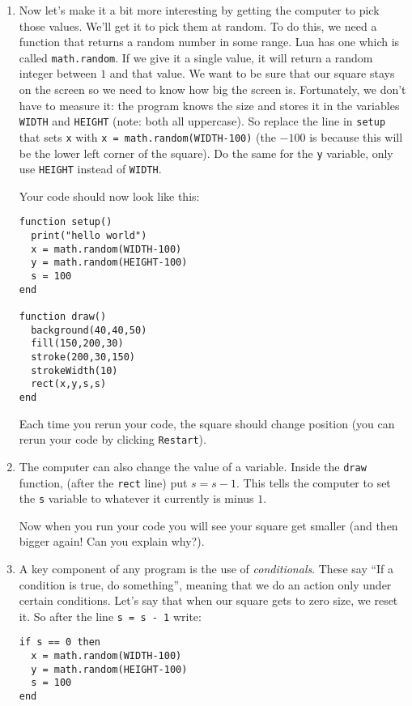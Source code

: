 \documentclass[
  xhtml,%
  text
]{internet}
\begin{document}
\begin{enumerate}
\item Now let's make it a bit more interesting by getting the computer to pick those values.
We'll get it to pick them at random.
To do this, we need a function that returns a random number in some range.
Lua has one which is called \verb+math.random+.
If we give it a single value, it will return a random integer between \(1\) and that value.
We want to be sure that our square stays on the screen so we need to know how big the screen is.
Fortunately, we don't have to measure it: the program knows the size and stores it in the variables \verb+WIDTH+ and \verb+HEIGHT+ (note: both all uppercase).
So replace the line in \verb+setup+ that sets \verb+x+ with \verb+x = math.random(WIDTH-100)+ (the \(-100\) is because this will be the lower left corner of the square).
Do the same for the \verb+y+ variable, only use \verb+HEIGHT+ instead of \verb+WIDTH+.

Your code should now look like this:

\begin{verbatim}
function setup()
  print("hello world")
  x = math.random(WIDTH-100)
  y = math.random(HEIGHT-100)
  s = 100
end

function draw()
  background(40,40,50)
  fill(150,200,30)
  stroke(200,30,150)
  strokeWidth(10)
  rect(x,y,s,s)
end
\end{verbatim}

Each time you rerun your code, the square should change position (you can rerun your code by clicking \verb+Restart+).

\item The computer can also change the value of a variable.
Inside the \verb+draw+ function, (after the \verb+rect+ line) put \(s = s - 1\).
This tells the computer to set the \verb+s+ variable to whatever it currently is minus \(1\).

Now when you run your code you will see your square get smaller (and then bigger again!  Can you explain why?).

\item A key component of any program is the use of \emph{conditionals}.
These say ``If a condition is true, do something'', meaning that we do an action only under certain conditions.
Let's say that when our square gets to zero size, we reset it.
So after the line \verb+s = s - 1+ write:

\begin{verbatim}
if s == 0 then
  x = math.random(WIDTH-100)
  y = math.random(HEIGHT-100)
  s = 100
end
\end{verbatim}


\end{enumerate}
\end{document}
